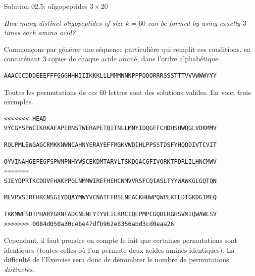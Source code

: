 \documentclass[ignorenonframetext,]{beamer}
\begin{document}
\begin{frame}[fragile]{Solution 02.5: oligopeptides \(3 \times 20\)}
\protect\hypertarget{solution-02.5-oligopeptides-3-times-20}{}

\emph{How many distinct oligopeptides of size \(k=60\) can be formed by
using exactly \(3\) times each amino acid?}

Commençons par générer une séquence particulière qui remplit ces
conditions, en concaténant 3 copies de chaque acide aminé, dans l'ordre
alphabétique.

\begin{verbatim}
AAACCCDDDEEEFFFGGGHHHIIIKKKLLLMMMNNNPPPQQQRRRSSSTTTVVVWWWYYY
\end{verbatim}

Toutes les permutations de ces 60 lettres sont des solutions valides. En
voici trois exemples.

\begin{verbatim}
<<<<<<< HEAD
VYCGYSPWCIKRKAFAPERNSTWERAPETQITNLLMNYIDQGFFCHDHSHWQGLVDKMMV
\end{verbatim}

\begin{verbatim}
RQLPMLEWGAGCRMKKNWNCAHNYERAYEFFMGKVWDIHLPPSSTDSFYHQQDIVTCVIT
\end{verbatim}

\begin{verbatim}
QYVINAHGEFEGFSPWMPNHYWSCEKDMTARYLTSKDQACGFIVQRKTPDRLILHNCMWV
=======
SIEYDPRTKCDDVFHAKPPGLNMMWIREFHEHCNMVVRSFCQIASLTYYWAWKGLGQTQN
\end{verbatim}

\begin{verbatim}
MEVPVSIRFHRCNSGIYDQAYMWYVCNATFFRSLNEACKHHWPQWPLKTLDTGKDGIMEQ
\end{verbatim}

\begin{verbatim}
TKKMWFSDTPHARYGRNFADCNENFYTYVEILKRCIQEPMPCGQDLHGHSVMIQWAWLSV
>>>>>>> 0084d050a30cebe47dfb962e8356abd3cd0eaa26
\end{verbatim}

Cependant, il faut prendre en compte le fait que certaines permutations
sont identiques (toutes celles où l'on permute deux acides aminés
identiques). La difficulté de l'Exercise sera donc de dénombrer le
nombre de permutations \emph{distinctes}.

\end{frame}
\end{document}
